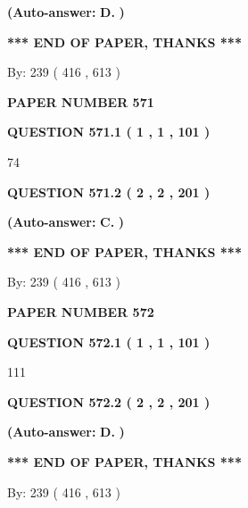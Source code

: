 \documentclass[12pt]{article}
\begin{document}
 
{\textbf{(Auto-answer:}}
{\textbf{\large{
D.}}}
{\textbf{)}}
 
 
   
   
   
   
\vspace{1.0in} 
{\textbf{\large{ *** END OF PAPER, THANKS *** }}} 
   
   
\hspace{1.0in} By: 
 239 ( 416 ,  613 )
   
   
   
   
\newpage 
\setcounter{page}{ 
   571001 } 
   
   
 {\textbf{ \Large{ PAPER NUMBER  571  }}}
   
   
   
   
  
  
{\textbf{\large{QUESTION
571.1 
 ( 1 , 1 , 101 )
}}}

74
  
  
{\textbf{\large{QUESTION
571.2 
 ( 2 , 2 , 201 )
}}}
 
 
{\textbf{(Auto-answer:}}
{\textbf{\large{
C.}}}
{\textbf{)}}
 
 
   
   
   
   
\vspace{1.0in} 
{\textbf{\large{ *** END OF PAPER, THANKS *** }}} 
   
   
\hspace{1.0in} By: 
 239 ( 416 ,  613 )
   
   
   
   
\newpage 
\setcounter{page}{ 
   572001 } 
   
   
 {\textbf{ \Large{ PAPER NUMBER  572  }}}
   
   
   
   
  
  
{\textbf{\large{QUESTION
572.1 
 ( 1 , 1 , 101 )
}}}

111
  
  
{\textbf{\large{QUESTION
572.2 
 ( 2 , 2 , 201 )
}}}
 
 
{\textbf{(Auto-answer:}}
{\textbf{\large{
D.}}}
{\textbf{)}}
 
 
   
   
   
   
\vspace{1.0in} 
{\textbf{\large{ *** END OF PAPER, THANKS *** }}} 
   
   
\hspace{1.0in} By: 
 239 ( 416 ,  613 )
   
   
   
\end{document}
